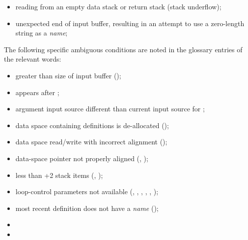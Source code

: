 \begin{itemize}
\item reading from an empty data stack or return stack
	(stack underflow);

\item unexpected end of input buffer, resulting in an attempt to
	use a zero-length string as a \emph{name};

\end{itemize}


The following specific ambiguous conditions are noted in the
glossary entries of the relevant words:

\begin{itemize}

\item {} greater than size of input buffer
	();

\item {} appears after
	;

\item argument input source different than current input source for
	;

\item data space containing definitions is de-allocated
	();

\item data space read/write with incorrect alignment
	();

\item data-space pointer not properly aligned
	(, );

\item less than +2 stack items (,
	);

\item loop-control parameters not available
	(,
	 ,
	 ,
	 ,
	 ,
	 );

\item most recent definition does not have a \emph{name}
	();

\item {}

\item {}


\end{itemize}
